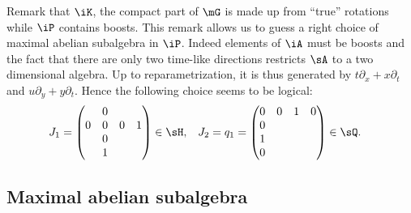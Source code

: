 Remark that $\iK$, the compact part of $\mG$ is made up from ``true'' rotations while $\iP$ contains boosts.  This remark allows us to guess a right choice of maximal abelian subalgebra in $\iP$. Indeed elements of $\iA$ must be boosts and the fact that there are only two time-like directions restricts $\sA$ to a two dimensional algebra. Up to reparametrization, it is thus generated by $t\partial_x+x\partial_t$ and $u\partial_y+y\partial_t$. Hence the following choice seems to be logical:
\begin{align}   \label{EqDevineA}
	J_1 & =
	\begin{pmatrix}
		  & 0         \\
		0 & 0 & 0 & 1 \\
		  & 0         \\
		  & 1
	\end{pmatrix}\in\sH,
	    & J_2 & =q_1=
	\begin{pmatrix}
		0 & 0 & 1 & 0 \\
		0             \\
		1             \\
		0
	\end{pmatrix}\in\sQ.
\end{align}

\subsection{Maximal abelian subalgebra}


